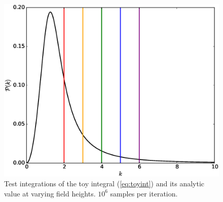 \documentclass[10pt,letterpaper]{article}
\begin{document}
\FloatBarrier

\begin{figure}[t] %
\centering %
\includegraphics[scale=0.45]{images/cutoff_guide.eps} 
\caption{Test integrations of the toy integral (\ref{eq:toyint}) and its analytic value at varying field heights. $10^6$ samples per iteration.}
\label{fig:toy_e6_wide}
\end{figure}
\end{document}
